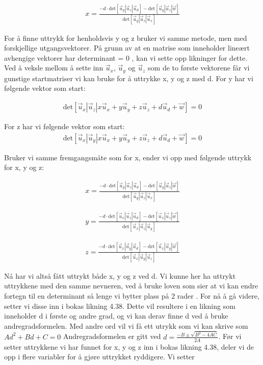 \begin{align}
    x=\frac{-d\cdot\text{det}[\vec{u}_y|\vec{u}_z | \vec{u}_d] 
	-\text{det}[\vec{u}_y|\vec{u}_z | \vec{w}]}{\text{det}[\vec{u}_y|\vec{u}_z | \vec{u}_x]}
\end{align}

For å finne uttrykk for henholdsvis y og z bruker vi samme metode, men med forskjellige utgangsvektorer. På grunn av at en matrise som inneholder lineært avhengige vektorer har determinant = 0 \cite{Determinants}, kan vi sette opp likninger for dette. Ved å veksle mellom å sette inn $\vec{u}_x$, $\vec{u}_y$ og $\vec{u}_z$ som de to første vektorene får vi gunstige startmatriser vi kan bruke for å uttrykke x, y og z med d. For y har vi følgende vektor som start: 

\begin{align} \label{eq:dety}
	\text{det}[\vec{u}_x|\vec{u}_z |x\vec{u}_x + y\vec{u}_y + z\vec{u}_z + d\vec{u}_d + \vec{w}]=0
\end{align}

For z har vi følgende vektor som start: 
\begin{align} \label{eq:detz}
	\text{det}[\vec{u}_x|\vec{u}_y |x\vec{u}_x + y\vec{u}_y + z\vec{u}_z + d\vec{u}_d + \vec{w}]=0
\end{align}

Bruker vi samme fremgangsmåte som for x, ender vi opp med følgende uttrykk for x, y og z: 

\begin{align}\label{eq:x}
    x=\frac{-d\cdot\text{det}[\vec{u}_y|\vec{u}_z | \vec{u}_d] 
	-\text{det}[\vec{u}_y|\vec{u}_z | \vec{w}]}{\text{det}[\vec{u}_y|\vec{u}_z | \vec{u}_x]}
\end{align}

\begin{align}\label{eq:y}
    y=\frac{-d\cdot\text{det}[\vec{u}_x|\vec{u}_z | \vec{u}_d] 
	-\text{det}[\vec{u}_x|\vec{u}_z | \vec{w}]}{\text{det}[\vec{u}_x|\vec{u}_z | \vec{u}_y]}
\end{align}

\begin{align}\label{eq:z}
    z=\frac{-d\cdot\text{det}[\vec{u}_x|\vec{u}_y | \vec{u}_d] 
	-\text{det}[\vec{u}_x|\vec{u}_y | \vec{w}]}{\text{det}[\vec{u}_x|\vec{u}_y | \vec{u}_z]}
\end{align}

Nå har vi altså fått uttrykt både x, y og z ved d. Vi kunne her ha uttrykt uttrykkene med den samme nevneren, ved å bruke loven som sier at vi kan endre fortegn til en determinant så lenge vi bytter plass på 2 rader \cite{TheDeterminant}. For nå å gå videre, setter vi disse inn i bokas likning 4.38. Dette vil resultere i en likning som inneholder d i første og andre grad, og vi kan derav finne d ved å bruke andregradsformelen. Med andre ord vil vi få ett utrykk som vi kan skrive som $Ad^2+Bd+C=0$ Andregradsformelen er gitt ved $d=\frac{-B \pm \sqrt{B^2-4AC}}{2A}$. Før vi setter uttrykkene vi har funnet for x, y og z inn i bokas likning 4.38, deler vi de opp i flere variabler for å gjøre uttrykket ryddigere. Vi setter

